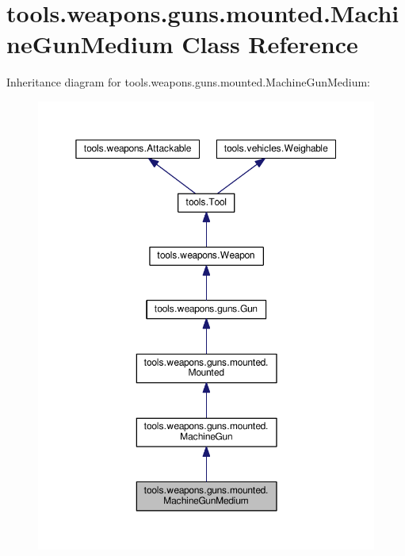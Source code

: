 \hypertarget{classtools_1_1weapons_1_1guns_1_1mounted_1_1_machine_gun_medium}{}\section{tools.\+weapons.\+guns.\+mounted.\+Machine\+Gun\+Medium Class Reference}
\label{classtools_1_1weapons_1_1guns_1_1mounted_1_1_machine_gun_medium}


Inheritance diagram for tools.\+weapons.\+guns.\+mounted.\+Machine\+Gun\+Medium\+:
\nopagebreak
\begin{figure}[H]
\begin{center}
\leavevmode
\includegraphics[width=350pt]{classtools_1_1weapons_1_1guns_1_1mounted_1_1_machine_gun_medium__inherit__graph}
\end{center}
\end{figure}


